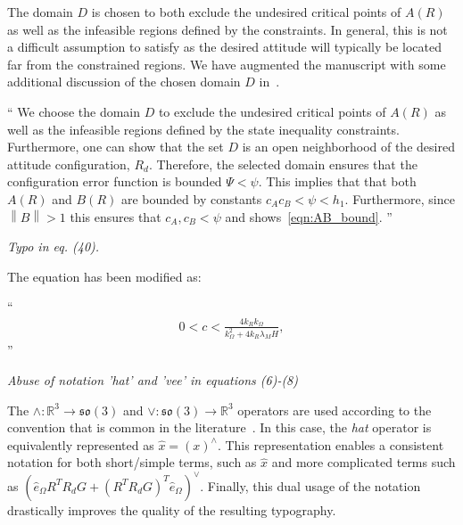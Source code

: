 \documentclass[11pt]{article}
\newcommand{\norm}[1]{\ensuremath{\left\| #1 \right\|}}
\newcommand{\parenth}[1]{\ensuremath{\left( #1 \right)}}
\newcommand{\so}{\ensuremath{\mathfrak{so}(3)}}
\newcommand{\R}{\ensuremath{\mathbb{R}}}
\newenvironment{correction}{\begin{list}{}{\setlength{\leftmargin}{1cm}\setlength{\rightmargin}{1cm}}\vspace{\parsep}\item[]``}{''\end{list}}
\begin{document}
\begin{enumerate}
The domain \( D \) is chosen to both exclude the undesired critical points of \( A(R)\) as well as the infeasible regions defined by the constraints. 
In general, this is not a difficult assumption to satisfy as the desired attitude will typically be located far from the constrained regions.
We have augmented the manuscript with some additional discussion of the chosen domain \( D \) in~.

\begin{correction}
    We choose the domain \( D \) to exclude the undesired critical points of \( A(R) \) as well as the infeasible regions defined by the state inequality constraints. 
    Furthermore, one can show that the set \( D \) is an open neighborhood of the desired attitude configuration, \( R_d\).
    Therefore, the selected domain ensures that the configuration error function is bounded \( \Psi < \psi \).
    This implies that that both \( A(R) \) and \( B(R) \) are bounded by constants \( c_A c_B < \psi < h_1\).
    Furthermore, since \( \norm{B} > 1 \) this ensures that \( c_A, c_B < \psi\) and shows~\cref{eqn:AB_bound}.
\end{correction}

\item \textit{Typo in eq. (40).}

The equation has been modified as:
\begin{correction}
\begin{gather}
    0 < c < \frac{4 k_R k_\Omega}{k_\Omega^2 + 4 k_R \lambda_M H} ,
\end{gather}
\end{correction}

\item \textit{Abuse of notation 'hat' and 'vee' in equations (6)-(8)}

The \( \wedge : \R^3 \to \so \) and \( \vee : \so \to \R^3 \) operators are used according to the convention that is common in the literature~\cite{lee2010,lee2011a}.
In this case, the \textit{hat} operator is equivalently represented as \( \hat{x} = \parenth{x}^\wedge \).
This representation enables a consistent notation for both short/simple terms, such as \( \hat{x} \) and more complicated terms such as \(\parenth{\hat{e}_\Omega R^T R_d G + (R^T R_d G)^T \hat{e}_\Omega}^\vee\). 
Finally, this dual usage of the notation drastically improves the quality of the resulting typography.

\end{enumerate}
\end{document}
